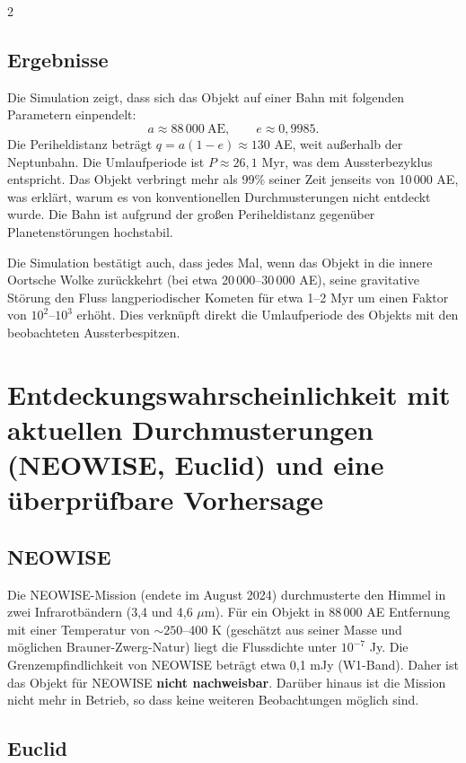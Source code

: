 \documentclass[11pt,a4paper]{article}
\begin{document}
\begin{multicols}{2}
		\subsection{Ergebnisse}
		
		Die Simulation zeigt, dass sich das Objekt auf einer Bahn mit folgenden Parametern einpendelt:
		\[
		a \approx 88\,000\ \text{AE},\qquad e \approx 0,9985.
		\]
		Die Periheldistanz beträgt \(q = a(1-e) \approx 130\) AE, weit außerhalb der Neptunbahn. Die Umlaufperiode ist \(P \approx 26,1\) Myr, was dem Aussterbezyklus entspricht. Das Objekt verbringt mehr als 99\% seiner Zeit jenseits von 10\,000 AE, was erklärt, warum es von konventionellen Durchmusterungen nicht entdeckt wurde. Die Bahn ist aufgrund der großen Periheldistanz gegenüber Planetenstörungen hochstabil.
		
		Die Simulation bestätigt auch, dass jedes Mal, wenn das Objekt in die innere Oortsche Wolke zurückkehrt (bei etwa 20\,000–30\,000 AE), seine gravitative Störung den Fluss langperiodischer Kometen für etwa 1–2 Myr um einen Faktor von \(10^2\)–\(10^3\) erhöht. Dies verknüpft direkt die Umlaufperiode des Objekts mit den beobachteten Aussterbespitzen.
		
		\section{Entdeckungswahrscheinlichkeit mit aktuellen Durchmusterungen (NEOWISE, Euclid) und eine überprüfbare Vorhersage}
		
		\subsection{NEOWISE}
		
		Die NEOWISE-Mission (endete im August 2024) durchmusterte den Himmel in zwei Infrarotbändern (3,4 und 4,6 \(\mu\)m). Für ein Objekt in 88\,000 AE Entfernung mit einer Temperatur von \(\sim 250\)–400 K (geschätzt aus seiner Masse und möglichen Brauner-Zwerg-Natur) liegt die Flussdichte unter \(10^{-7}\) Jy. Die Grenzempfindlichkeit von NEOWISE beträgt etwa 0,1 mJy (W1-Band). Daher ist das Objekt für NEOWISE \textbf{nicht nachweisbar}. Darüber hinaus ist die Mission nicht mehr in Betrieb, so dass keine weiteren Beobachtungen möglich sind.
		
		\subsection{Euclid}
		

\end{multicols}
\end{document}

